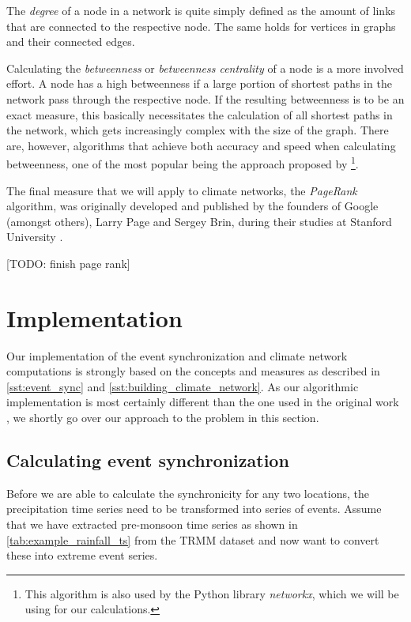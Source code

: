 The \textit{degree} of a node in a network is quite simply defined as the amount of links that are connected to the respective node. The same holds for vertices in graphs and their connected edges.

Calculating the \textit{betweenness} or \textit{betweenness centrality} of a node is a more involved effort. A node has a high betweenness if a large portion of shortest paths in the network pass through the respective node. If the resulting betweenness is to be an exact measure, this basically necessitates the calculation of all shortest paths in the network, which gets increasingly complex with the size of the graph. There are, however, algorithms that achieve both accuracy and speed when calculating betweenness, one of the most popular being the approach proposed by \citet{Brandes.2001}\footnote{This algorithm is also used by the Python library \textit{networkx}, which we will be using for our calculations.}.

The final measure that we will apply to climate networks, the \textit{PageRank} algorithm, was originally developed and published by the founders of Google (amongst others), Larry Page and Sergey Brin, during their studies at Stanford University \citep{Page.1999}.

[TODO: finish page rank]

\section{Implementation}
\label{st:event_sync_implementation}
Our implementation of the event synchronization and climate network computations is strongly based on the concepts and measures as described in \cref{sst:event_sync} and \cref{sst:building_climate_network}. As our algorithmic implementation is most certainly different than the one used in the original work \citep{Stolbova.2015}, we shortly go over our approach to the problem in this section.

\subsection{Calculating event synchronization}
\label{sst:event_sync_calculation}
Before we are able to calculate the synchronicity for any two locations, the precipitation time series need to be transformed into series of events. Assume that we have extracted pre-monsoon time series as shown in \cref{tab:example_rainfall_ts} from the TRMM dataset and now want to convert these into extreme event series.

